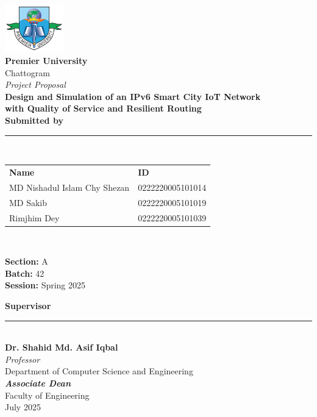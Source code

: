 \documentclass[12pt,a4paper]{article}
\begin{document}
\begin{titlepage}
    \begin{center}
        \vspace*{0.4cm}
        \includegraphics[width=0.19\textwidth]{Logo_of_Premier_University_(PU).png}\\[0.8cm]
        
        {\fontsize{28}{34}\selectfont \textbf{Premier University}}\\[0.15cm]
        {\fontsize{17}{21}\selectfont Chattogram}\\[0.6cm]

        {\Large \textit{Project Proposal}}\\[0.2cm]

        {\fontsize{18}{24}\selectfont \textbf{Design and Simulation of an IPv6 Smart City IoT Network}}\\[0.08cm]
        {\fontsize{13}{16}\selectfont \textbf{with Quality of Service and Resilient Routing}}\\[0.7cm]

        {\large \textbf{Submitted by}}\\[0.08cm]
\rule{0.21\textwidth}{0.7pt}\\[0.12cm]

\renewcommand{\arraystretch}{1.2}
\begin{tabular}{p{6.5cm} l}
    \textbf{Name} & \textbf{ID} \\
    MD Nishadul Islam Chy Shezan & 0222220005101014 \\
    MD Sakib & 0222220005101019 \\
    Rimjhim Dey & 0222220005101039 \\
\end{tabular}\\[0.6cm]

\begin{center}
    \textbf{Section:} A \\[0.1cm]
    \textbf{Batch:} 42 \\[0.1cm]
    \textbf{Session:} Spring 2025
\end{center}

        {\large \textbf{Supervisor}}\\[0.08cm]
        \rule{0.17\textwidth}{0.7pt}\\[0.11cm]
        {\textbf{Dr. Shahid Md. Asif Iqbal}}\\
        \textit{Professor}\\
        Department of Computer Science and Engineering\\
        \textbf{\textit{Associate Dean}}\\
        Faculty of Engineering\\[0.35cm]

        \vfill
        {\normalsize July 2025}
    \end{center}
\end{titlepage}
\end{document}
